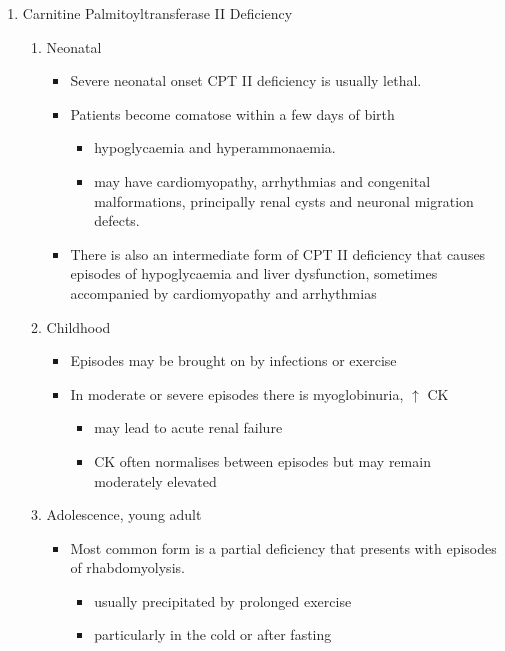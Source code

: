 \documentclass{scrartcl}
\begin{document}
\begin{enumerate}
\item Carnitine Palmitoyltransferase II Deficiency
\label{sec:org9059e32}
\begin{enumerate}
\item Neonatal
\label{sec:org423b2aa}
\begin{itemize}
\item Severe neonatal onset CPT II deficiency is usually lethal.
\item Patients become comatose within a few days of birth
\begin{itemize}
\item hypoglycaemia and hyperammonaemia.
\item may have cardiomyopathy, arrhythmias and congenital malformations,
principally renal cysts and neuronal migration defects.
\end{itemize}
\item There is also an intermediate form of CPT II deficiency that causes
episodes of hypoglycaemia and liver dysfunction, sometimes
accompanied by cardiomyopathy and arrhythmias
\end{itemize}

\item Childhood
\label{sec:orgf35076d}
\begin{itemize}
\item Episodes may be brought on by infections or exercise
\item In moderate or severe episodes there is myoglobinuria, \(\uparrow\) CK
\begin{itemize}
\item may lead to acute renal failure
\item CK often normalises between episodes but may remain moderately
elevated
\end{itemize}
\end{itemize}

\item Adolescence,  young adult
\label{sec:org9b50201}
\begin{itemize}
\item Most common form is a partial deficiency that presents with
episodes of rhabdomyolysis.
\begin{itemize}
\item usually precipitated by prolonged exercise
\item particularly in the cold or after fasting
\end{itemize}
\end{itemize}
\end{enumerate}
\end{enumerate}
\end{document}
